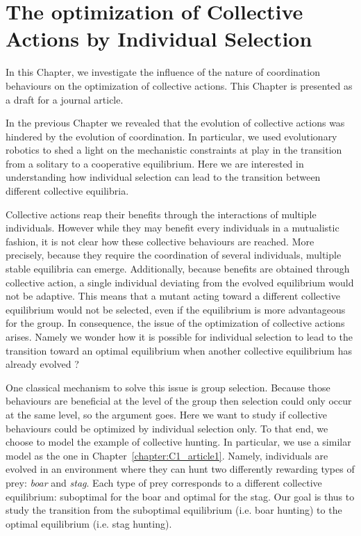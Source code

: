 \chapter{The optimization of Collective Actions by Individual Selection}
\label{chapter:C1_article2}

\setcounter{secnumdepth}{0}
\setcounter{minitocdepth}{1}
\minitoc[n] %

In this Chapter, we investigate the influence of the nature of coordination behaviours on the optimization of collective actions. This Chapter is presented as a draft for a journal article.

In the previous Chapter we revealed that the evolution of collective actions was hindered by the evolution of coordination. In particular, we used evolutionary robotics to shed a light on the mechanistic constraints at play in the transition from a solitary to a cooperative equilibrium. Here we are interested in understanding how individual selection can lead to the transition between different collective equilibria.

Collective actions reap their benefits through the interactions of multiple individuals. However while they may benefit every individuals in a mutualistic fashion, it is not clear how these collective behaviours are reached. More precisely, because they require the coordination of several individuals, multiple stable equilibria can emerge. Additionally, because benefits are obtained through collective action, a single individual deviating from the evolved equilibrium would not be adaptive. This means that a mutant acting toward a different collective equilibrium would not be selected, even if the equilibrium is more advantageous for the group. In consequence, the issue of the optimization of collective actions arises. Namely we wonder how it is possible for individual selection to lead to the transition toward an optimal equilibrium when another collective equilibrium has already evolved ?

One classical mechanism to solve this issue is group selection. Because those behaviours are beneficial at the level of the group then selection could only occur at the same level, so the argument goes. Here we want to study if collective behaviours could be optimized by individual selection only. To that end, we choose to model the example of collective hunting. In particular, we use a similar model as the one in Chapter~\ref{chapter:C1_article1}. Namely, individuals are evolved in an environment where they can hunt two differently rewarding types of prey: \emph{boar} and \emph{stag}. Each type of prey corresponds to a different collective equilibrium: suboptimal for the boar and optimal for the stag. Our goal is thus to study the transition from the suboptimal equilibrium (i.e. boar hunting) to the optimal equilibrium (i.e. stag hunting).

